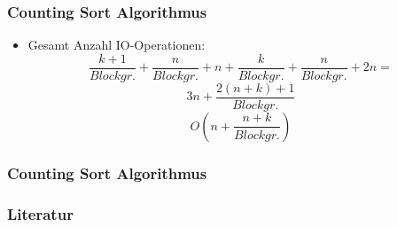 \documentclass{beamer}
\begin{document}
\begin{frame}
  \frametitle{Counting Sort Algorithmus}
  \begin{itemize}
    \item Gesamt Anzahl IO-Operationen:
    \begin{equation*}
      \frac{k+1}{Blockgr.} +
      \frac{n}{Blockgr.} + n +
      \frac{k}{Blockgr.} +
      \frac{n}{Blockgr.} + 2n =
    \end{equation*}
    \begin{equation*}
      3n+\frac{2(n+k)+1}{Blockgr.}
    \end{equation*}
    \begin{equation*}
      O(n+\frac{n+k}{Blockgr.})
    \end{equation*}
  \end{itemize}
\end{frame}

\begin{frame}
  \frametitle{Counting Sort Algorithmus}
\end{frame}

\begin{frame}
  \frametitle{Literatur}

  
  
\end{frame}
\end{document}
